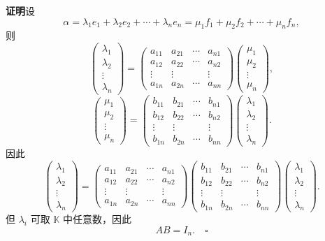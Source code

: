 \documentclass[UTF8,12pt,a4paper,fontset=fandol]{ctexart}
\begin{document}
\noindent\textbf{证明}\quad 设
\[
\alpha=\lambda_1e_1+\lambda_2e_2+\cdots+\lambda_ne_n=\mu_1f_1+\mu_2f_2+\cdots+\mu_nf_n,
\]
则
\[
\left(\begin{array}{c}
\lambda_1\\
\lambda_2\\
\vdots\\
\lambda_n
\end{array}\right)
=
\left(\begin{array}{cccc}
a_{11}&a_{21}&\cdots&a_{n1}\\
a_{12}&a_{22}&\cdots&a_{n2}\\
\vdots&\vdots&&\vdots\\
a_{1n}&a_{2n}&\cdots&a_{nn}
\end{array}\right)
\left(\begin{array}{c}
\mu_1\\
\mu_2\\
\vdots\\
\mu_n
\end{array}\right),
\]
\[
\left(\begin{array}{c}
\mu_1\\
\mu_2\\
\vdots\\
\mu_n
\end{array}\right)
=
\left(\begin{array}{cccc}
b_{11}&b_{21}&\cdots&b_{n1}\\
b_{12}&b_{22}&\cdots&b_{n2}\\
\vdots&\vdots&&\vdots\\
b_{1n}&b_{2n}&\cdots&b_{nn}
\end{array}\right)
\left(\begin{array}{c}
\lambda_1\\
\lambda_2\\
\vdots\\
\lambda_n
\end{array}\right).
\]
因此
\[
\left(\begin{array}{c}
\lambda_1\\
\lambda_2\\
\vdots\\
\lambda_n
\end{array}\right)
=
\left(\begin{array}{cccc}
a_{11}&a_{21}&\cdots&a_{n1}\\
a_{12}&a_{22}&\cdots&a_{n2}\\
\vdots&\vdots&&\vdots\\
a_{1n}&a_{2n}&\cdots&a_{nn}
\end{array}\right)
\left(\begin{array}{cccc}
b_{11}&b_{21}&\cdots&b_{n1}\\
b_{12}&b_{22}&\cdots&b_{n2}\\
\vdots&\vdots&&\vdots\\
b_{1n}&b_{2n}&\cdots&b_{nn}
\end{array}\right)
\left(\begin{array}{c}
\lambda_1\\
\lambda_2\\
\vdots\\
\lambda_n
\end{array}\right).
\]
但 $\lambda_i$ 可取 $\mathbb{K}$ 中任意数，因此
\[
AB=I_n. \quad \square
\]
\end{document}
